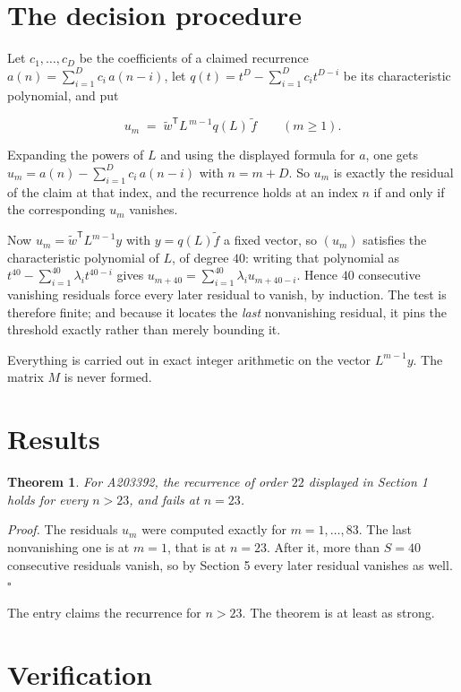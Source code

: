 \documentclass[11pt]{article}
\newtheorem{theorem}{Theorem}
\theoremstyle{definition}
\begin{document}
\section{The decision procedure}

Let $c_1,\dots,c_D$ be the coefficients of a claimed recurrence $a(n) = \sum_{i=1}^{D} c_i\,a(n-i)$, let $q(t) = t^{D} - \sum_{i=1}^{D} c_i t^{D-i}$ be its characteristic polynomial, and put

\[u_m \;=\; \tilde w^{\mathsf T} L^{\,m-1} q(L)\,\tilde f \qquad (m \ge 1).\]

Expanding the powers of $L$ and using the displayed formula for $a$, one gets $u_m = a(n) - \sum_{i=1}^{D} c_i\,a(n-i)$ with $n = m + D$. So $u_m$ is exactly the residual of the claim at that index, and the recurrence holds at an index $n$ if and only if the corresponding $u_m$ vanishes.

Now $u_m = \tilde w^{\mathsf T} L^{m-1} y$ with $y = q(L)\tilde f$ a fixed vector, so $(u_m)$ satisfies the characteristic polynomial of $L$, of degree $40$: writing that polynomial as $t^{40} - \sum_{i=1}^{40} \lambda_i t^{40-i}$ gives $u_{m+40} = \sum_{i=1}^{40} \lambda_i u_{m+40-i}$. Hence $40$ consecutive vanishing residuals force every later residual to vanish, by induction. The test is therefore finite; and because it locates the {\itshape last} nonvanishing residual, it pins the threshold exactly rather than merely bounding it.

Everything is carried out in exact integer arithmetic on the vector $L^{m-1}y$. The matrix $M$ is never formed.

\section{Results}

\begin{theorem} For A203392, the recurrence of order $22$ displayed in Section 1 holds for every $n > 23$, and fails at $n = 23$.\end{theorem}

{\itshape Proof.} The residuals $u_m$ were computed exactly for $m = 1,\dots,83$. The last nonvanishing one is at $m = 1$, that is at $n = 23$. After it, more than $S = 40$ consecutive residuals vanish, so by Section 5 every later residual vanishes as well. $\square$

The entry claims the recurrence for $n > 23$. The theorem is at least as strong.

\section{Verification}
\end{document}
